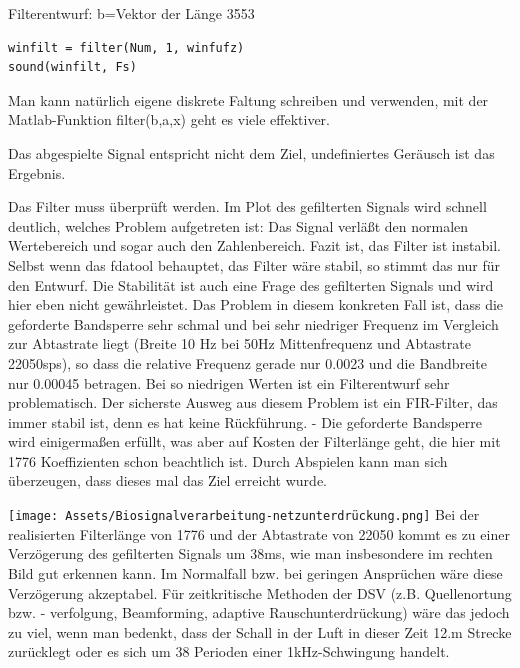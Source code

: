 \documentclass[a4paper]{article}
\begin{document}
\begin{multicols}{3}
\begin{itemize*}
\begin{itemize*}
      \item Filterentwurf: b=Vektor der Länge 3553
    \end{itemize*}
    \begin{verbatim}
winfilt = filter(Num, 1, winfufz)
sound(winfilt, Fs)
\end{verbatim}
    \item Man kann natürlich eigene diskrete Faltung schreiben und verwenden, mit der Matlab-Funktion filter(b,a,x) geht es viele effektiver.
    \item Das abgespielte Signal entspricht nicht dem Ziel, undefiniertes Geräusch ist das Ergebnis.
    \item Das Filter muss überprüft werden. Im Plot des gefilterten Signals wird schnell deutlich, welches Problem aufgetreten ist: Das Signal verläßt den normalen Wertebereich und sogar auch den Zahlenbereich. Fazit ist, das Filter ist instabil. Selbst wenn das fdatool behauptet, das Filter wäre stabil, so stimmt das nur für den Entwurf. Die Stabilität ist auch eine Frage des gefilterten Signals und wird hier eben nicht gewährleistet. Das Problem in diesem konkreten Fall ist, dass die geforderte Bandsperre sehr schmal und bei sehr niedriger Frequenz im Vergleich zur Abtastrate liegt (Breite 10 Hz bei 50Hz Mittenfrequenz und Abtastrate 22050sps), so dass die relative Frequenz gerade nur 0.0023 und die Bandbreite nur 0.00045 betragen. Bei so niedrigen Werten ist ein Filterentwurf sehr problematisch. Der sicherste Ausweg aus diesem Problem ist ein FIR-Filter, das immer stabil ist, denn es hat keine Rückführung. - Die geforderte Bandsperre wird einigermaßen erfüllt, was aber auf Kosten der Filterlänge geht, die hier mit 1776 Koeffizienten schon beachtlich ist. Durch Abspielen kann man sich überzeugen, dass dieses mal das Ziel erreicht wurde.
  \end{itemize*}

  \texttt{[image: Assets/Biosignalverarbeitung-netzunterdrückung.png]} Bei
  der realisierten Filterlänge von 1776 und der Abtastrate von 22050 kommt
  es zu einer Verzögerung des gefilterten Signals um 38ms, wie man
  insbesondere im rechten Bild gut erkennen kann. Im Normalfall bzw. bei
  geringen Ansprüchen wäre diese Verzögerung akzeptabel. Für zeitkritische
  Methoden der DSV (z.B. Quellenortung bzw. - verfolgung, Beamforming,
  adaptive Rauschunterdrückung) wäre das jedoch zu viel, wenn man bedenkt,
  dass der Schall in der Luft in dieser Zeit 12.m Strecke zurücklegt oder
  es sich um 38 Perioden einer 1kHz-Schwingung handelt.


\end{multicols}
\end{document}
